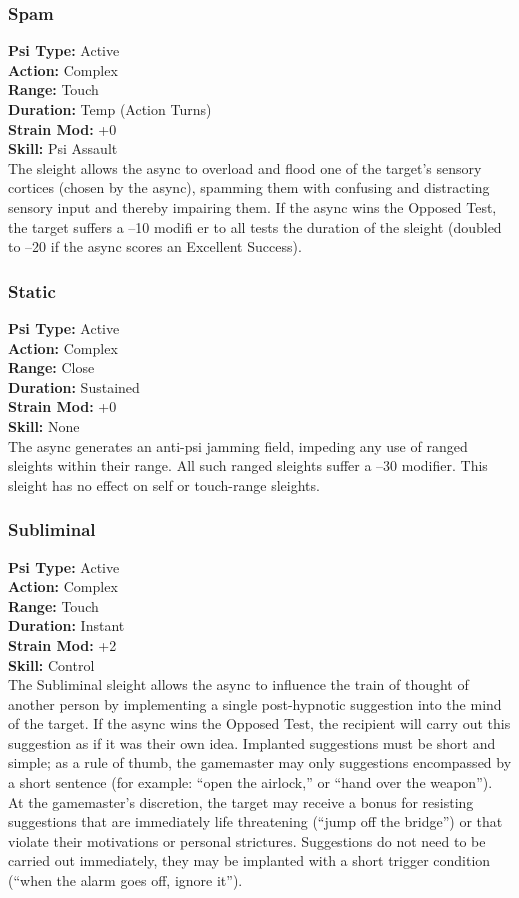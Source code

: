 \subsubsection{Spam}
\textbf{Psi Type:} Active \\ 
\textbf{Action:} Complex \\ 
\textbf{Range:} Touch \\ 
\textbf{Duration:} Temp (Action Turns) \\
\textbf{Strain Mod:} +0 \\ 
\textbf{Skill:} Psi Assault \\
The sleight allows the async to overload and flood one
of the target’s sensory cortices (chosen by the async),
spamming them with confusing and distracting sensory
input and thereby impairing them. If the async
wins the Opposed Test, the target suffers a –10 modifi
er to all tests the duration of the sleight (doubled to
–20 if the async scores an Excellent Success).

\subsubsection{Static}
\textbf{Psi Type:} Active \\ 
\textbf{Action:} Complex \\ 
\textbf{Range:} Close \\ 
\textbf{Duration:} Sustained \\
\textbf{Strain Mod:} +0 \\ 
\textbf{Skill:} None\\
The async generates an anti-psi jamming field, impeding
any use of ranged sleights within their range. All
such ranged sleights suffer a –30 modifier. This sleight
has no effect on self or touch-range sleights.

\subsubsection{Subliminal}
\textbf{Psi Type:} Active \\ 
\textbf{Action:} Complex \\ 
\textbf{Range:} Touch \\ 
\textbf{Duration:} Instant \\
\textbf{Strain Mod:} +2 \\ 
\textbf{Skill:} Control\\
The Subliminal sleight allows the async to influence
the train of thought of another person by implementing
a single post-hypnotic suggestion into the mind
of the target. If the async wins the Opposed Test, the
recipient will carry out this suggestion as if it was
their own idea. Implanted suggestions must be short
and simple; as a rule of thumb, the gamemaster may
only suggestions encompassed by a short sentence
(for example: “open the airlock,” or “hand over the
weapon”). At the gamemaster’s discretion, the target
may receive a bonus for resisting suggestions that are
immediately life threatening (“jump off the bridge”)
or that violate their motivations or personal strictures.
Suggestions do not need to be carried out immediately,
they may be implanted with a short trigger condition
(“when the alarm goes off, ignore it”).


